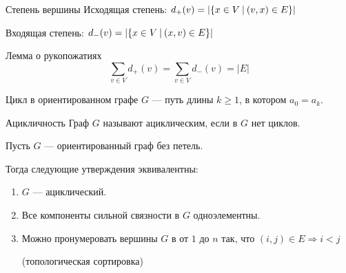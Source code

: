 \begin{defn}{Степень вершины}{}
    Исходящая степень: \( d_+(v) = | \{ x \in V \ \vline \ (v, x) \in E \} | \)

    Входящая степень: \( d_-(v) = | \{ x \in V \ \vline \ (x, v) \in E \} | \)
\end{defn}

\begin{thrm}{Лемма о рукопожатиях}{}
    \[
        \sum\limits_{v \in V} d_+(v) = \sum\limits_{v \in V} d_-(v) = |E|
    \]
\end{thrm}

\begin{defn}{}{}
    Цикл в ориентированном графе \( G \) --- путь длины \( k \geq 1 \), в котором \( a_0 = a_k \).
\end{defn}

\begin{defn}{Ацикличность}{}
    Граф \( G \) называют ациклическим, если в \( G \) нет циклов.
\end{defn}

\begin{thrm}{}{}
    Пусть \( G \) --- ориентированный граф без петель.

    Тогда следующие утверждения эквивалентны:
    \begin{enumerate}
        \item
            \( G \) --- ациклический.
        \item
            Все компоненты сильной связности в \( G \) одноэлементны.
        \item
            Можно пронумеровать вершины \( G \) в от \( 1 \) до \( n \) так,
            что \( (i, j) \in E \Rightarrow i < j \)

            (топологическая сортировка)
    \end{enumerate}
\end{thrm}

